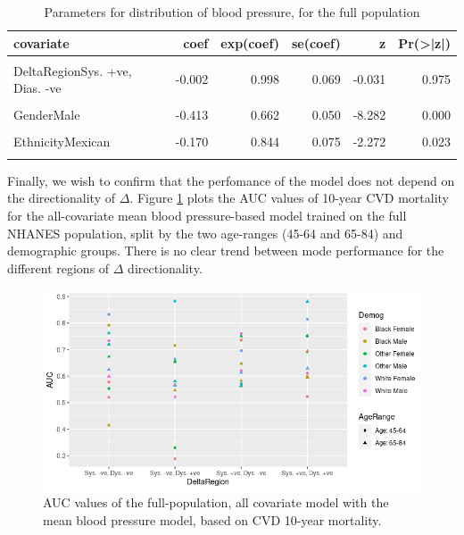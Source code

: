 \documentclass[
]{article}
\begin{document}
\begin{table}[!h]
\centering
\caption{\label{tab:DeltaDir}Parameters for distribution of blood pressure, for the full population}
\centering
\begin{tabular}[t]{lrrrrr}
\toprule
covariate & coef & exp(coef) & se(coef) & z & Pr(>|z|)\\
\midrule
\cellcolor{gray!10}{DeltaRegionSys. -ve, Dias. +ve} & \cellcolor{gray!10}{0.047} & \cellcolor{gray!10}{1.048} & \cellcolor{gray!10}{0.074} & \cellcolor{gray!10}{0.634} & \cellcolor{gray!10}{0.526}\\
DeltaRegionSys. +ve, Dias. -ve & -0.002 & 0.998 & 0.069 & -0.031 & 0.975\\
\cellcolor{gray!10}{DeltaRegionSys. +ve, Dias. +ve} & \cellcolor{gray!10}{-0.056} & \cellcolor{gray!10}{0.946} & \cellcolor{gray!10}{0.063} & \cellcolor{gray!10}{-0.881} & \cellcolor{gray!10}{0.378}\\
GenderMale & -0.413 & 0.662 & 0.050 & -8.282 & 0.000\\
\cellcolor{gray!10}{EthnicityWhite} & \cellcolor{gray!10}{-0.248} & \cellcolor{gray!10}{0.780} & \cellcolor{gray!10}{0.061} & \cellcolor{gray!10}{-4.043} & \cellcolor{gray!10}{0.000}\\
EthnicityMexican & -0.170 & 0.844 & 0.075 & -2.272 & 0.023\\
\cellcolor{gray!10}{age} & \cellcolor{gray!10}{0.100} & \cellcolor{gray!10}{1.105} & \cellcolor{gray!10}{0.002} & \cellcolor{gray!10}{50.573} & \cellcolor{gray!10}{0.000}\\
\bottomrule
\end{tabular}
\end{table}

Finally, we wish to confirm that the perfomance of the model does not depend on the directionality of \(\Delta\). Figure \ref{fig:DeltaAUCs} plots the AUC values of 10-year CVD mortality for the all-covariate mean blood pressure-based model trained on the full NHANES population, split by the two age-ranges (45-64 and 65-84) and demographic groups. There is no clear trend between mode performance for the different regions of \(\Delta\) directionality.

\begin{figure}
\centering
\includegraphics{./Rmarkdown_Plots/DeltaDirection_AUCs.png}
\caption{AUC values of the full-population, all covariate model with the mean blood pressure model, based on CVD 10-year mortality.}\label{fig:DeltaAUCs}
\end{figure}
\end{document}
